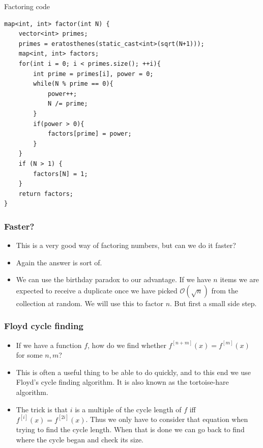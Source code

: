 \documentclass{beamer}
\begin{document}
\begin{frame}{Factoring code}
    \begin{verbatim}
map<int, int> factor(int N) {
    vector<int> primes;
    primes = eratosthenes(static_cast<int>(sqrt(N+1)));
    map<int, int> factors;
    for(int i = 0; i < primes.size(); ++i){
        int prime = primes[i], power = 0;
        while(N % prime == 0){
            power++;
            N /= prime;
        }
        if(power > 0){
            factors[prime] = power;
        }
    }
    if (N > 1) {
        factors[N] = 1;
    }
    return factors;
}
  \end{verbatim}
\end{frame}

\begin{frame}[plain]
\frametitle{Faster?}

\begin{itemize}

\item This is a very good way of factoring numbers, but can we do it faster?
    
\item Again the answer is sort of.

\item We can use the birthday paradox to our advantage. If we have $n$ items we are expected to receive a duplicate once we have picked $\mathcal{O}(\sqrt{n})$ from the collection at random. We will use this to factor $n$. But first a small side step.

\end{itemize}

\end{frame}

\begin{frame}[plain]
\frametitle{Floyd cycle finding}

\begin{itemize}

\item If we have a function $f$, how do we find whether $f^{[n+m]}(x) = f^{[m]}(x)$ for some $n, m$?

\item This is often a useful thing to be able to do quickly, and to this end we use Floyd's cycle finding algorithm. It is also known as the tortoise-hare algorithm.

\item The trick is that $i$ is a multiple of the cycle length of $f$ iff  $f^{[i]}(x) = f^{[2i]}(x)$. Thus we only have to consider that equation when trying to find the cycle length. When that is done we can go back to find where the cycle began and check its size.

\end{itemize}

\end{frame}
\end{document}
